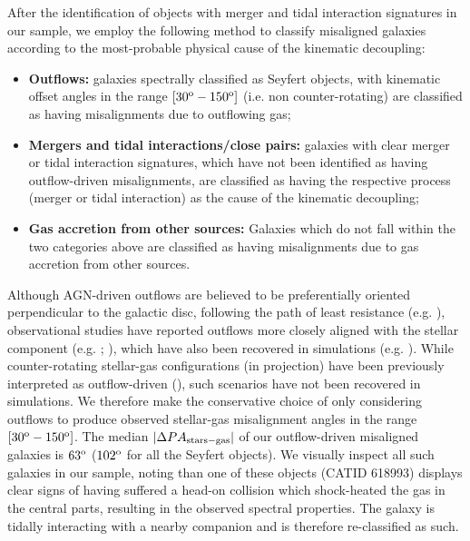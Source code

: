 \documentclass[fleqn,usenatbib]{mnras}
\begin{document}
After the identification of objects with merger and tidal interaction signatures in our sample, we employ the following method to classify misaligned galaxies according to the most-probable physical cause of the kinematic decoupling:

\begin{itemize}
    
    \item \textbf{Outflows:} galaxies spectrally classified as Seyfert objects, with kinematic offset angles in the range $[30^{\rm{o}}-150^{\rm{o}}]$ (i.e. non counter-rotating) are classified as having misalignments due to outflowing gas;
    
    \item \textbf{Mergers and tidal interactions/close pairs:} galaxies with clear merger or tidal interaction signatures, which have not been identified as having outflow-driven misalignments, are classified as having the respective process (merger or tidal interaction) as the cause of the kinematic decoupling;
    
    \item \textbf{Gas accretion from other sources:} Galaxies which do not fall within the two categories above are classified as having 
    misalignments due to gas accretion from other sources.
    
\end{itemize}

Although AGN-driven outflows are believed to be preferentially oriented perpendicular to the galactic disc, following the path of least resistance (e.g. \citealt*{TilmanHartwig2018}), observational studies have reported outflows more closely aligned with the stellar component (e.g. \citealt{Barbosa2009}; \citealt{Husemann2019}), which have also been recovered in simulations (e.g. \citealt{Tanner2022}). While counter-rotating stellar-gas configurations (in projection) have been previously interpreted as outflow-driven (\citealt{RongxinLuo2019L}), such scenarios have not been recovered in simulations. We therefore make the conservative choice of only considering outflows to produce observed stellar-gas misalignment angles in the range  $[30^{\rm{o}}-150^{\rm{o}}]$. The median $|\Delta PA_{\rm{stars-gas}}|$  of our outflow-driven misaligned galaxies is $63^{\rm{o}}$ ($102^{\rm{o}}$ for all the Seyfert objects). We visually inspect all such galaxies in our sample, noting than one of these objects (CATID 618993) displays clear signs of having suffered a head-on collision which shock-heated the gas in the central parts, resulting in the observed spectral properties. The galaxy is tidally interacting with a nearby companion and is therefore re-classified as such.
\end{document}
